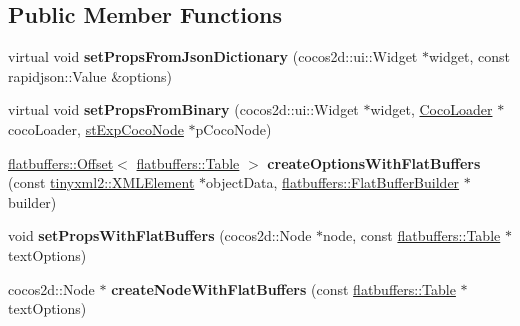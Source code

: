 \subsection*{Public Member Functions}
\begin{DoxyCompactItemize}
\item 
\mbox{\label{classcocostudio_1_1TextReader_ac353fdec425190d560d6d2cf2d0c48c6}} 
virtual void {\bfseries set\+Props\+From\+Json\+Dictionary} (cocos2d\+::ui\+::\+Widget $\ast$widget, const rapidjson\+::\+Value \&options)
\item 
\mbox{\label{classcocostudio_1_1TextReader_a42b2460de83046ffb90b828d94e1f6bc}} 
virtual void {\bfseries set\+Props\+From\+Binary} (cocos2d\+::ui\+::\+Widget $\ast$widget, \hyperlink{classcocostudio_1_1CocoLoader}{Coco\+Loader} $\ast$coco\+Loader, \hyperlink{structcocostudio_1_1stExpCocoNode}{st\+Exp\+Coco\+Node} $\ast$p\+Coco\+Node)
\item 
\mbox{\label{classcocostudio_1_1TextReader_ab29af43e5c52eabb445a6b99728270c9}} 
\hyperlink{structflatbuffers_1_1Offset}{flatbuffers\+::\+Offset}$<$ \hyperlink{classflatbuffers_1_1Table}{flatbuffers\+::\+Table} $>$ {\bfseries create\+Options\+With\+Flat\+Buffers} (const \hyperlink{classtinyxml2_1_1XMLElement}{tinyxml2\+::\+X\+M\+L\+Element} $\ast$object\+Data, \hyperlink{classflatbuffers_1_1FlatBufferBuilder}{flatbuffers\+::\+Flat\+Buffer\+Builder} $\ast$builder)
\item 
\mbox{\label{classcocostudio_1_1TextReader_a1f45bfdfa6d0f9676841579b444a998b}} 
void {\bfseries set\+Props\+With\+Flat\+Buffers} (cocos2d\+::\+Node $\ast$node, const \hyperlink{classflatbuffers_1_1Table}{flatbuffers\+::\+Table} $\ast$text\+Options)
\item 
\mbox{\label{classcocostudio_1_1TextReader_ace8e6c056196fbdc161ed8df0bc4fc6c}} 
cocos2d\+::\+Node $\ast$ {\bfseries create\+Node\+With\+Flat\+Buffers} (const \hyperlink{classflatbuffers_1_1Table}{flatbuffers\+::\+Table} $\ast$text\+Options)
\item 
\mbox{\label{classcocostudio_1_1TextReader_ac353fdec425190d560d6d2cf2d0c48c6}} 

\end{DoxyCompactItemize}
